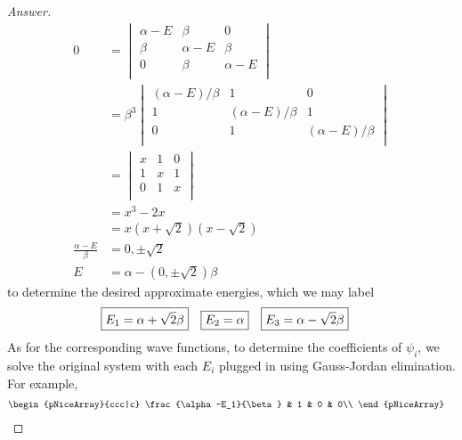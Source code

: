 \documentclass[../psets.tex]{subfiles}
\begin{document}
\begin{enumerate}
\begin{enumerate}
\begin{proof}[Answer]
            \begingroup
            \allowdisplaybreaks
            \begin{align*}
                0 &=
                \begin{vmatrix}
                    \alpha-E & \beta & 0\\
                    \beta & \alpha-E & \beta\\
                    0 & \beta & \alpha-E\\
                \end{vmatrix}\\
                &= \beta^3
                \begin{vmatrix}
                    (\alpha-E)/\beta & 1 & 0\\
                    1 & (\alpha-E)/\beta & 1\\
                    0 & 1 & (\alpha-E)/\beta\\
                \end{vmatrix}\\
                &=
                \begin{vmatrix}
                    x & 1 & 0\\
                    1 & x & 1\\
                    0 & 1 & x\\
                \end{vmatrix}\\
                &= x^3-2x\\
                &= x(x+\sqrt{2})(x-\sqrt{2})\\
                \frac{\alpha-E}{\beta} &= 0,\pm\sqrt{2}\\
                E &= \alpha-(0,\pm\sqrt{2})\beta
            \end{align*}
            \endgroup
            to determine the desired approximate energies, which we may label
            \begin{align*}
                \Aboxed{E_1 &= \alpha+\sqrt{2}\beta}&
                \Aboxed{E_2 &= \alpha}&
                \Aboxed{E_3 &= \alpha-\sqrt{2}\beta}
            \end{align*}
            As for the corresponding wave functions, to determine the coefficients of $\psi_i$, we solve the original system with each $E_i$ plugged in using Gauss-Jordan elimination. For example,
            \begin{align*}
                &
                \begin{pNiceArray}{ccc|c}
                    \frac{\alpha-E_1}{\beta} & 1 & 0 & 0\\

\end{pNiceArray}
\end{align*}
\end{proof}
\end{enumerate}
\end{enumerate}
\end{document}

